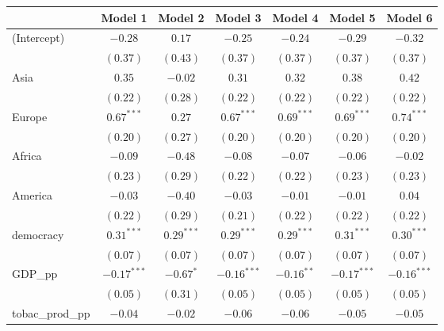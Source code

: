 
\begin{table}[!h]
\begin{center}
\begin{tabular}{l c c c c c c }
\toprule
 & Model 1 & Model 2 & Model 3 & Model 4 & Model 5 & Model 6 \\
\midrule
(Intercept)             & $-0.28$       & $0.17$       & $-0.25$       & $-0.24$      & $-0.29$       & $-0.32$       \\
                        & $(0.37)$      & $(0.43)$     & $(0.37)$      & $(0.37)$     & $(0.37)$      & $(0.37)$      \\
Asia                    & $0.35$        & $-0.02$      & $0.31$        & $0.32$       & $0.38$        & $0.42$        \\
                        & $(0.22)$      & $(0.28)$     & $(0.22)$      & $(0.22)$     & $(0.22)$      & $(0.22)$      \\
Europe                  & $0.67^{***}$  & $0.27$       & $0.67^{***}$  & $0.69^{***}$ & $0.69^{***}$  & $0.74^{***}$  \\
                        & $(0.20)$      & $(0.27)$     & $(0.20)$      & $(0.20)$     & $(0.20)$      & $(0.20)$      \\
Africa                  & $-0.09$       & $-0.48$      & $-0.08$       & $-0.07$      & $-0.06$       & $-0.02$       \\
                        & $(0.23)$      & $(0.29)$     & $(0.22)$      & $(0.22)$     & $(0.23)$      & $(0.23)$      \\
America                 & $-0.03$       & $-0.40$      & $-0.03$       & $-0.01$      & $-0.01$       & $0.04$        \\
                        & $(0.22)$      & $(0.29)$     & $(0.21)$      & $(0.22)$     & $(0.22)$      & $(0.22)$      \\
democracy               & $0.31^{***}$  & $0.29^{***}$ & $0.29^{***}$  & $0.29^{***}$ & $0.31^{***}$  & $0.30^{***}$  \\
                        & $(0.07)$      & $(0.07)$     & $(0.07)$      & $(0.07)$     & $(0.07)$      & $(0.07)$      \\
GDP\_pp                 & $-0.17^{***}$ & $-0.67^{*}$  & $-0.16^{***}$ & $-0.16^{**}$ & $-0.17^{***}$ & $-0.16^{***}$ \\
                        & $(0.05)$      & $(0.31)$     & $(0.05)$      & $(0.05)$     & $(0.05)$      & $(0.05)$      \\
tobac\_prod\_pp         & $-0.04$       & $-0.02$      & $-0.06$       & $-0.06$      & $-0.05$       & $-0.05$       \\

\end{tabular}
\end{center}
\end{table}
